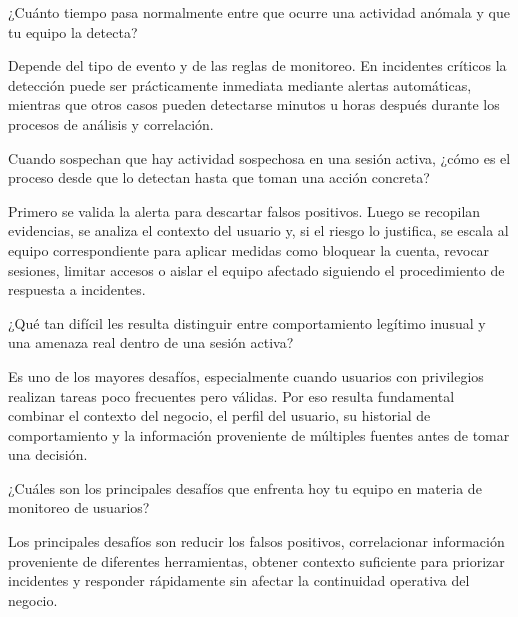 \begin{description}[leftmargin=0cm, labelsep=0.5cm]
    \item[\textbf{Pregunta 4:}] ¿Cuánto tiempo pasa normalmente entre que ocurre una actividad anómala y que tu equipo la detecta?

    \item[\textbf{RUIZ MATÍAS GABRIEL:}] Depende del tipo de evento y de las reglas de monitoreo. En incidentes críticos la detección puede ser prácticamente inmediata mediante alertas automáticas, mientras que otros casos pueden detectarse minutos u horas después durante los procesos de análisis y correlación.

    \item[\textbf{Pregunta 5:}] Cuando sospechan que hay actividad sospechosa en una sesión activa, ¿cómo es el proceso desde que lo detectan hasta que toman una acción concreta?

    \item[\textbf{RUIZ MATÍAS GABRIEL:}] Primero se valida la alerta para descartar falsos positivos. Luego se recopilan evidencias, se analiza el contexto del usuario y, si el riesgo lo justifica, se escala al equipo correspondiente para aplicar medidas como bloquear la cuenta, revocar sesiones, limitar accesos o aislar el equipo afectado siguiendo el procedimiento de respuesta a incidentes.

    \item[\textbf{Pregunta 6:}] ¿Qué tan difícil les resulta distinguir entre comportamiento legítimo inusual y una amenaza real dentro de una sesión activa?

    \item[\textbf{RUIZ MATÍAS GABRIEL:}] Es uno de los mayores desafíos, especialmente cuando usuarios con privilegios realizan tareas poco frecuentes pero válidas. Por eso resulta fundamental combinar el contexto del negocio, el perfil del usuario, su historial de comportamiento y la información proveniente de múltiples fuentes antes de tomar una decisión.

    \item[\textbf{Pregunta 7:}] ¿Cuáles son los principales desafíos que enfrenta hoy tu equipo en materia de monitoreo de usuarios?

    \item[\textbf{RUIZ MATÍAS GABRIEL:}] Los principales desafíos son reducir los falsos positivos, correlacionar información proveniente de diferentes herramientas, obtener contexto suficiente para priorizar incidentes y responder rápidamente sin afectar la continuidad operativa del negocio.


\end{description}
